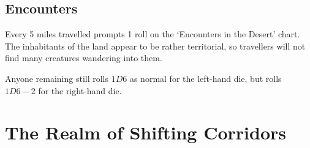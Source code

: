 \begin{multicols}{2}
\subsection{Encounters}

Every 5 miles travelled prompts 1 roll on the `Encounters in the Desert' chart.
The inhabitants of the land appear to be rather territorial, so travellers will not find many creatures wandering into them.

Anyone remaining still rolls $1D6$ as normal for the left-hand die,
but rolls $1D6-2$ for the right-hand die.

\end{multicols}

\section{The Realm of Shifting Corridors}\label{shiftingcorridors}


